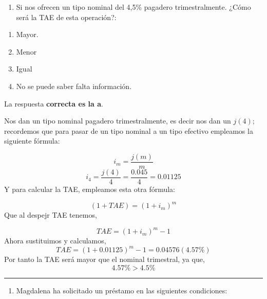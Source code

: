 \documentclass[
  letterpaper,
  DIV=11,
  numbers=noendperiod]{scrreprt}
\providecommand{\tightlist}{%
  \setlength{\itemsep}{0pt}\setlength{\parskip}{0pt}}\usepackage{longtable,booktabs,array}
\begin{document}
\begin{enumerate}
\def\labelenumi{\arabic{enumi}.}
\setcounter{enumi}{70}
\tightlist
\item
  Si nos ofrecen un tipo nominal del 4,5\% pagadero trimestralmente.
  ¿Cómo será la TAE de esta operación?:
\end{enumerate}

\begin{enumerate}
\def\labelenumi{\alph{enumi})}
\item
  Mayor.
\item
  Menor
\item
  Igual
\item
  No se puede saber falta información.
\end{enumerate}

\begin{tcolorbox}[enhanced jigsaw, left=2mm, opacityback=0, colback=white, breakable, arc=.35mm, bottomrule=.15mm, rightrule=.15mm, toprule=.15mm, leftrule=.75mm, colframe=quarto-callout-tip-color-frame]
\begin{minipage}[t]{5.5mm}
\textcolor{quarto-callout-tip-color}{\faLightbulb}
\end{minipage}%
\begin{minipage}[t]{\textwidth - 5.5mm}

La respuesta \textbf{correcta es la a}.

Nos dan un tipo nominal pagadero trimestralmente, es decir nos dan un
\(j(4)\); recordemos que para pasar de un tipo nominal a un tipo
efectivo empleamos la siguiente fórmula:

\[i_m=\frac{j\left(m\right)}{m}\]
\[i_4=\frac{j\left(4\right)}{4}=\frac{0.045}{4}=0.01125\] Y para
calcular la TAE, empleamos esta otra fórmula:

\[\left(1+TAE\right)=\left(1+i_m\right)^m\] Que al despejr TAE tenemos,

\[TAE=\left(1+i_m\right)^m-1\] Ahora sustituimos y calculamos,
\[TAE=\left(1+0.01125\right)^m-1=0.04576(4.57\%)\] Por tanto la TAE será
mayor que el nominal trimestral, ya que, \[4.57\% >4.5\% \]

\end{minipage}%
\end{tcolorbox}

\begin{center}\rule{0.5\linewidth}{0.5pt}\end{center}

\begin{enumerate}
\def\labelenumi{\arabic{enumi}.}
\setcounter{enumi}{71}
\tightlist
\item
  Magdalena ha solicitado un préstamo en las siguientes condiciones:
\end{enumerate}
\end{document}
